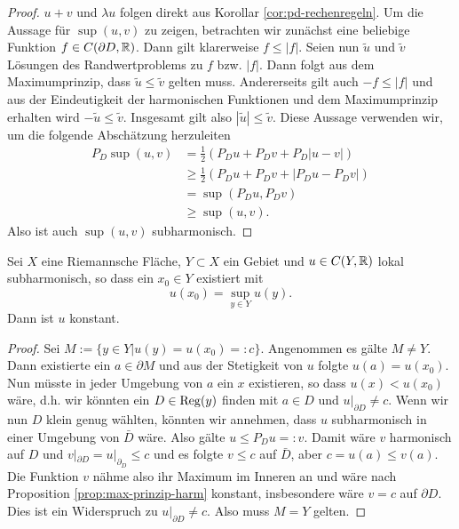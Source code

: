 \begin{proof}
  $u+v$ und $\lambda u$ folgen direkt aus Korollar
  \ref{cor:pd-rechenregeln}. Um die Aussage für $\sup(u,v)$ zu zeigen,
  betrachten wir zunächst eine beliebige Funktion $f \in C(\partial D,
  \mathbb{R})$. Dann gilt klarerweise $f \leq |f|$. Seien nun $\tilde u$ und
  $\tilde v$ Lösungen des Randwertproblems zu $f$ bzw. $|f|$. Dann
  folgt aus dem Maximumprinzip, dass $\tilde u \leq \tilde v$ gelten
  muss. Andererseits gilt auch $-f \leq |f|$ und aus der Eindeutigkeit
  der harmonischen Funktionen und dem Maximumprinzip erhalten wird $-
  \tilde u \leq \tilde v$. Insgesamt gilt also $|\tilde u| \leq \tilde
  v$. Diese Aussage verwenden wir, um die folgende Abschätzung herzuleiten
  \begin{align*}
    P_D \sup(u,v) & = \frac{1}{2} ( P_D u + P_D v + P_D|u - v|) \\
    & \geq \frac12 (P_D u + P_D v + |P_D u - P_D v|) \\
    & = \sup(P_D u, P_D v) \\
    & \geq \sup(u,v).
  \end{align*}
  Also ist auch $\sup(u,v)$ subharmonisch.
\end{proof}

\begin{thm}
  Sei $X$ eine Riemannsche Fläche, $Y \subset X$ ein Gebiet und $u
  \in C(Y, \mathbb{R})$ lokal subharmonisch, so dass ein $x_0 \in Y$ existiert
  mit
  \[
  u(x_0) = \sup_{y\in Y} u(y).
  \]
  Dann ist $u$ konstant.
\end{thm}

\begin{proof}
  Sei $M:= \{y \in Y | u(y) = u(x_0) =: c \}$. Angenommen es gälte $M \neq
  Y$. Dann existierte ein $a \in \partial M$ und aus der Stetigkeit
  von $u$ folgte $u(a) = u(x_0)$. Nun müsste in jeder Umgebung von $a$
  ein $x$ existieren, so dass $u(x) < u(x_0)$ wäre, d.h. wir könnten ein
  $D \in \operatorname{Reg}(y)$ finden mit $a \in D$ und $u|_{\partial D} \not
  = c$. Wenn wir nun $D$ klein genug wählten, könnten wir annehmen, dass $u$
  subharmonisch in einer Umgebung von $\bar D$ wäre. Also gälte $u \leq
  P_D u =: v$. Damit wäre $v$ harmonisch auf $D$ und $v|_{\partial D} =
  u|_{\partial_D} \leq c$ und es folgte $v \leq c$ auf $\bar D$, aber
  $c = u(a) \leq v(a)$. Die Funktion $v$ nähme also ihr Maximum im Inneren an und
  wäre nach Proposition \ref{prop:max-prinzip-harm} konstant,
  insbesondere wäre $v = c$ auf $\partial D$. Dies ist ein Widerspruch zu
  $u|_{\partial D} \not = c$. Also muss $M = Y$ gelten.
\end{proof}

